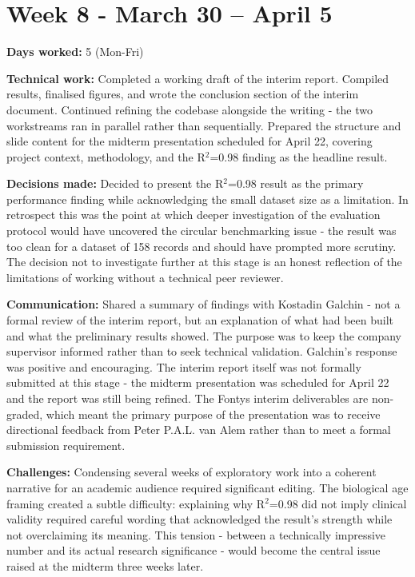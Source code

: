 \documentclass[11pt,a4paper]{article}
\begin{document}
\section{Week 8  -  March 30 – April 5}

\textbf{Days worked:} 5 (Mon-Fri)

\textbf{Technical work:} Completed a working draft of the interim report. Compiled results, finalised figures, and wrote the conclusion section of the interim document. Continued refining the codebase alongside the writing  -  the two workstreams ran in parallel rather than sequentially. Prepared the structure and slide content for the midterm presentation scheduled for April 22, covering project context, methodology, and the R$^{2}$=0.98 finding as the headline result.

\textbf{Decisions made:} Decided to present the R$^{2}$=0.98 result as the primary performance finding while acknowledging the small dataset size as a limitation. In retrospect this was the point at which deeper investigation of the evaluation protocol would have uncovered the circular benchmarking issue  -  the result was too clean for a dataset of 158 records and should have prompted more scrutiny. The decision not to investigate further at this stage is an honest reflection of the limitations of working without a technical peer reviewer.

\textbf{Communication:} Shared a summary of findings with Kostadin Galchin  -  not a formal review of the interim report, but an explanation of what had been built and what the preliminary results showed. The purpose was to keep the company supervisor informed rather than to seek technical validation. Galchin's response was positive and encouraging. The interim report itself was not formally submitted at this stage  -  the midterm presentation was scheduled for April 22 and the report was still being refined. The Fontys interim deliverables are non-graded, which meant the primary purpose of the presentation was to receive directional feedback from Peter P.A.L. van Alem rather than to meet a formal submission requirement.

\textbf{Challenges:} Condensing several weeks of exploratory work into a coherent narrative for an academic audience required significant editing. The biological age framing created a subtle difficulty: explaining why R$^{2}$=0.98 did not imply clinical validity required careful wording that acknowledged the result's strength while not overclaiming its meaning. This tension  -  between a technically impressive number and its actual research significance  -  would become the central issue raised at the midterm three weeks later.
\end{document}
